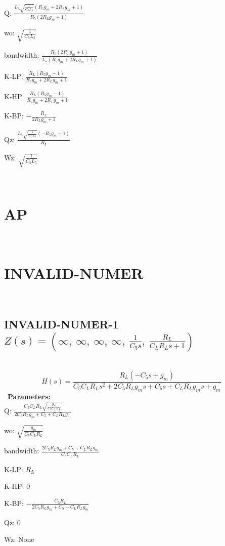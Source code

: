 \documentclass{article}
\begin{document}
Q: $\frac{L_{5} \sqrt{\frac{1}{C_{5} L_{5}}} \left(R_{5} g_{m} + 2 R_{L} g_{m} + 1\right)}{R_{5} \left(2 R_{L} g_{m} + 1\right)}$\ 

wo: $\sqrt{\frac{1}{C_{5} L_{5}}}$\ 

bandwidth: $\frac{R_{5} \left(2 R_{L} g_{m} + 1\right)}{L_{5} \left(R_{5} g_{m} + 2 R_{L} g_{m} + 1\right)}$\ 

K-LP: $\frac{R_{L} \left(R_{5} g_{m} - 1\right)}{R_{5} g_{m} + 2 R_{L} g_{m} + 1}$\ 

K-HP: $\frac{R_{L} \left(R_{5} g_{m} - 1\right)}{R_{5} g_{m} + 2 R_{L} g_{m} + 1}$\ 

K-BP: $- \frac{R_{L}}{2 R_{L} g_{m} + 1}$\ 

Qz: $\frac{L_{5} \sqrt{\frac{1}{C_{5} L_{5}}} \left(- R_{5} g_{m} + 1\right)}{R_{5}}$\ 

Wz: $\sqrt{\frac{1}{C_{5} L_{5}}}$\ 

\ 

\section{AP}\ 
\section{INVALID-NUMER}\ 
\subsection{INVALID-NUMER-1 $Z(s) = \left( \infty, \  \infty, \  \infty, \  \infty, \  \frac{1}{C_{5} s}, \  \frac{R_{L}}{C_{L} R_{L} s + 1}\right)$ } \ 
\textbf{\[H(s) = \frac{R_{L} \left(- C_{5} s + g_{m}\right)}{C_{5} C_{L} R_{L} s^{2} + 2 C_{5} R_{L} g_{m} s + C_{5} s + C_{L} R_{L} g_{m} s + g_{m}}\] } \ 
\textbf{Parameters:}\\ 

Q: $\frac{C_{5} C_{L} R_{L} \sqrt{\frac{g_{m}}{C_{5} C_{L} R_{L}}}}{2 C_{5} R_{L} g_{m} + C_{5} + C_{L} R_{L} g_{m}}$\ 

wo: $\sqrt{\frac{g_{m}}{C_{5} C_{L} R_{L}}}$\ 

bandwidth: $\frac{2 C_{5} R_{L} g_{m} + C_{5} + C_{L} R_{L} g_{m}}{C_{5} C_{L} R_{L}}$\ 

K-LP: $R_{L}$\ 

K-HP: $0$\ 

K-BP: $- \frac{C_{5} R_{L}}{2 C_{5} R_{L} g_{m} + C_{5} + C_{L} R_{L} g_{m}}$\ 

Qz: $0$\ 

Wz: $\text{None}$\ 
\end{document}
